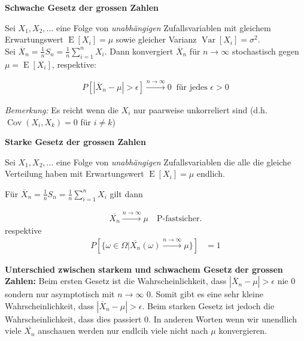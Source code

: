 \documentclass[25pt]{sciposter}
\newcommand{\Var}{\operatorname{Var}}
\newcommand{\E}{\operatorname{E}}
\newenvironment{method}[1]{\begin{mdframed}[backgroundcolor=blue!10,innertopmargin=15pt, innerbottommargin=15pt,nobreak=true]
		\textbf{#1 }
	}
	{ 
	\end{mdframed}
}
\begin{document}
\begin{multicols}{3}
\begin{method}{Schwache Gesetz der grossen Zahlen}
	Sei $X_1,X_2,\ldots$ eine Folge von \textit{unabhängigen} Zufallsvariablen mit gleichem Erwartungswert $\E[X_i] = \mu$ sowie gleicher Varianz $\Var[X_i] = \sigma^2$.\\
	
	
	Sei $\overline{X}_n = \frac{1}{n}S_n = \frac{1}{n} \sum_{i=1}^{n} X_i$. Dann konvergiert $\overline{X}_n$ für $n\to\infty $ stochastisch gegen $\mu = \E[X_i]$, respektive:
	
	\begin{align*}
		P[|\overline{X}_n - \mu|> \epsilon] \stackrel{n\to\infty}{\longrightarrow}   0 \ \text{ für jedes }\epsilon > 0
	\end{align*}
	
	\textit{Bemerkung:} Es reicht wenn die $X_i$ nur paarweise unkorreliert sind (d.h. $\operatorname{Cov}(X_i,X_k) = 0$ für $i \neq k$)
	
\end{method}


\begin{method}{Starke Gesetz der grossen Zahlen}
	Sei $X_1,X_2,\ldots$ eine Folge von \textit{unabhängigen} Zufallsvariablen die alle die gleiche Verteilung haben mit Erwartungswert $\E[X_i] = \mu$ endlich. 
	
	Für $\overline{X}_n = \frac{1}{n}S_n = \frac{1}{n} \sum_{i=1}^{n} X_i$ gilt dann 
	
	\begin{align*}
		\overline{X_n} \stackrel{n \to \infty}{\longrightarrow} \mu \quad \text{P-fastsicher}.
	\end{align*}  
	respektive
	\begin{align*}
	P\left[ \{ \omega \in \Omega | \overline{X_n}(\omega)  \stackrel{n \to \infty}{\longrightarrow}  \mu  \} \right] &= 1
	\end{align*}
\end{method}

\textbf{Unterschied zwischen starkem und schwachem Gesetz der grossen Zahlen:} Beim ersten Gesetz ist die Wahrscheinlichkeit, dass $|\overline{X}_n - \mu|> \epsilon$ nie 0 sondern nur asymptotisch mit $n \to \infty$ 0. Somit gibt es eine sehr kleine Wahrscheinlichkeit, dass $|\overline{X}_n - \mu| > \epsilon$. Beim starken Gesetz ist jedoch die Wahrscheinlichkeit, dass dies passiert 0. In anderen Worten wenn wir unendlich viele $\overline{X_n}$ anschauen werden nur endlcih viele nicht nach $\mu$ konvergieren.


\end{multicols}
\end{document}

